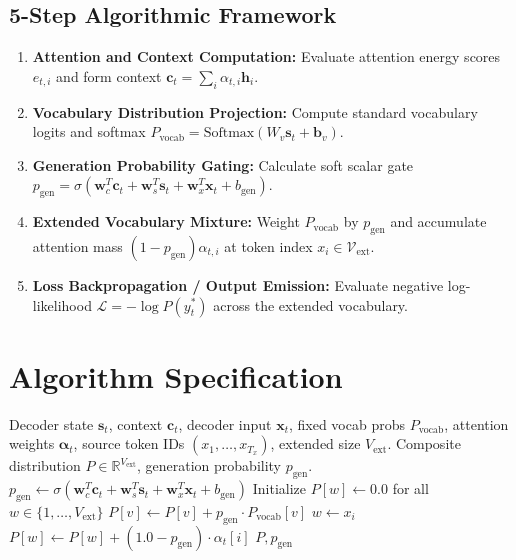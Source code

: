 \documentclass[11pt,a4paper]{article}
\theoremstyle{definition}
\begin{document}
\subsection{5-Step Algorithmic Framework}
\begin{enumerate}
    \item \textbf{Attention and Context Computation:} Evaluate attention energy scores $e_{t, i}$ and form context $\mathbf{c}_t = \sum_i \alpha_{t, i} \mathbf{h}_i$.
    \item \textbf{Vocabulary Distribution Projection:} Compute standard vocabulary logits and softmax $P_{\text{vocab}} = \text{Softmax}(W_v \mathbf{s}_t + \mathbf{b}_v)$.
    \item \textbf{Generation Probability Gating:} Calculate soft scalar gate $p_{\text{gen}} = \sigma(\mathbf{w}_c^T \mathbf{c}_t + \mathbf{w}_s^T \mathbf{s}_t + \mathbf{w}_x^T \mathbf{x}_t + b_{\text{gen}})$.
    \item \textbf{Extended Vocabulary Mixture:} Weight $P_{\text{vocab}}$ by $p_{\text{gen}}$ and accumulate attention mass $(1 - p_{\text{gen}}) \alpha_{t, i}$ at token index $x_i \in \mathcal{V}_{\text{ext}}$.
    \item \textbf{Loss Backpropagation / Output Emission:} Evaluate negative log-likelihood $\mathcal{L} = -\log P(y_t^*)$ across the extended vocabulary.
\end{enumerate}

\section{Algorithm Specification}

\begin{algorithm}[H]
\caption{Pointer-Generator Hybrid Copy Step}
\label{alg:pointer_copy}
\begin{algorithmic}[1]
\Require Decoder state $\mathbf{s}_t$, context $\mathbf{c}_t$, decoder input $\mathbf{x}_t$, fixed vocab probs $P_{\text{vocab}}$, attention weights $\boldsymbol{\alpha}_t$, source token IDs $(x_1, \dots, x_{T_x})$, extended size $V_{\text{ext}}$.
\Ensure Composite distribution $P \in \mathbb{R}^{V_{\text{ext}}}$, generation probability $p_{\text{gen}}$.
\State $p_{\text{gen}} \gets \sigma(\mathbf{w}_c^T \mathbf{c}_t + \mathbf{w}_s^T \mathbf{s}_t + \mathbf{w}_x^T \mathbf{x}_t + b_{\text{gen}})$
\State Initialize $P[w] \gets 0.0$ for all $w \in \{1, \dots, V_{\text{ext}}\}$
    \State $P[v] \gets P[v] + p_{\text{gen}} \cdot P_{\text{vocab}}[v]$
\EndFor
{}
    \State $w \gets x_i$
    \State $P[w] \gets P[w] + (1.0 - p_{\text{gen}}) \cdot \alpha_t[i]$
\EndFor
\State \Return $P, p_{\text{gen}}$
\end{algorithmic}
\end{algorithm}
\end{document}
